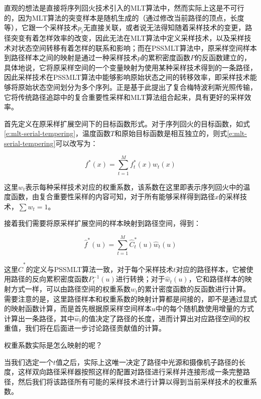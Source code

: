 直观的想法是直接将序列回火技术引入的MLT算法中，然而实际上这是不可行的，因为MLT算法的突变样本是随机生成的（通过修改当前路径的顶点，长度等），它跟一个采样技术$p_i$无直接关联，或者说无法得知随着采样技术的变更，路径突变有着怎样效率的改变，因此无法在MLT算法中定义采样技术，以及采样技术对状态空间转移有着怎样的联系和影响；而在PSSMLT算法中，原采样空间样本到路径样本之间的映射是通过一种采样技术$p$的累积密度函数$P$的反函数建立的，具体地说，它将原采样空间的一个变量映射为使用某种采样技术得到的一条路径，因此采样技术在PSSMLT算法中能够影响原始状态之间的转移效率，即采样技术能够将原始状态空间划分为多个序列。\cite{a:MultiplexedMetropolisLightTransport}正是基于此提出了复合梅特波利斯光照传输，它将传统路径追踪中的复合重要性采样和MLT算法组合起来，具有更好的采样效率。

首先定义在原采样扩展空间下的目标函数形式。对于序列回火的目标函数，如式\ref{e:mlt-serial-tempering}，温度函数$T$和原始目标函数是相互独立的，则式\ref{e:mlt-serial-tempering}可以改写为：

\begin{equation}\label{e:mlt-pssmlt-tempering}
	f^{*}({x})=\sum^{M}_{t=1}f^{*}_t({x})w_t({x})
\end{equation}

\noindent 这里$w_t$表示每种采样技术对应的权重系数，该系数在这里即表示序列回火中的温度函数，由复合重要性采样的内容可知，对于所有能够采样得到路径${x}$的采样技术，$\sum w_t=1$。

接着我们需要将原采样扩展空间的样本映射到路径空间，得到：

\begin{equation}
	\hat{f}^{*}({u})=\sum^{M}_{t=1}\hat{C}^{*}_t({u})\hat{w}_t({u})
\end{equation}

\noindent 这里$\hat{C}^{*}$的定义与PSSMLT算法一致，对于每个采样技术$t$对应的路径样本，它被使用路径的反向累积密度函数$P^{-1}_t({u})$进行转换；对于$\hat{w}_t({u})$，它和路径样本的映射方式一样，可以由路径空间的权重系数$w_t$的累计密度函数的反函数进行计算。需要注意的是，这里路径样本和权重系数的映射计算都是间接的，即不是通过显式的映射函数计算，而是首先根据原采样空间样本${u}$中的每个随机数使用增量的方式计算出一条路径，其中$\hat{w}_t$的值决定了路径的长度，进而计算出对应路径空间的权重值，我们将在后面进一步讨论路径贡献值的计算。

\begin{myshaded}
	权重系数实际是怎么映射的呢？
	
	当我们选定一个$t$值之后，实际上这唯一决定了路径中光源和摄像机子路径的长度，这样双向路径采样器按照这样的配置对路径进行采样并连接形成一条完整路径，然后我们将该路径所有可能的采样技术进行计算以得到当前采样技术的权重系数。
\end{myshaded}


